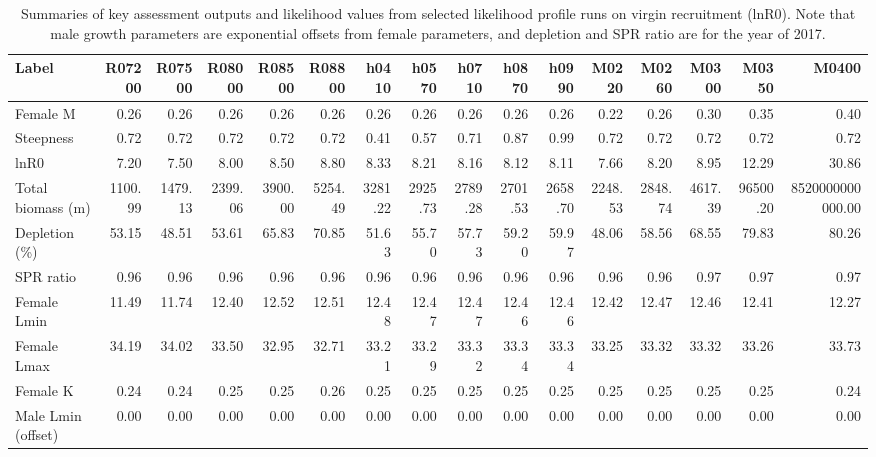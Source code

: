 \documentclass[12pt,]{article}
\begin{document}
\begin{landscape}
\begin{table}[ht]
\centering
\caption{Summaries of key assessment outputs 
                                              and likelihood values from selected 
                                              likelihood profile runs on virgin 
                                              recruitment (lnR0).  Note that male 
                                              growth parameters are exponential 
                                              offsets from female parameters, and 
                                              depletion and SPR ratio are for the year of 2017.} 
\label{tab:like_profiles}
\begin{tabular}{lrrrrrrrrrrrrrrr}
  \hline
Label & R07200 & R07500 & R08000 & R08500 & R08800 & h0410 & h0570 & h0710 & h0870 & h0990 & M0220 & M0260 & M0300 & M0350 & M0400 \\ 
  \hline
Female M & 0.26 & 0.26 & 0.26 & 0.26 & 0.26 & 0.26 & 0.26 & 0.26 & 0.26 & 0.26 & 0.22 & 0.26 & 0.30 & 0.35 & 0.40 \\ 
  Steepness & 0.72 & 0.72 & 0.72 & 0.72 & 0.72 & 0.41 & 0.57 & 0.71 & 0.87 & 0.99 & 0.72 & 0.72 & 0.72 & 0.72 & 0.72 \\ 
  lnR0 & 7.20 & 7.50 & 8.00 & 8.50 & 8.80 & 8.33 & 8.21 & 8.16 & 8.12 & 8.11 & 7.66 & 8.20 & 8.95 & 12.29 & 30.86 \\ 
  Total biomass (m) & 1100.99 & 1479.13 & 2399.06 & 3900.00 & 5254.49 & 3281.22 & 2925.73 & 2789.28 & 2701.53 & 2658.70 & 2248.53 & 2848.74 & 4617.39 & 96500.20 & 8520000000000.00 \\ 
  Depletion (\%) & 53.15 & 48.51 & 53.61 & 65.83 & 70.85 & 51.63 & 55.70 & 57.73 & 59.20 & 59.97 & 48.06 & 58.56 & 68.55 & 79.83 & 80.26 \\ 
  SPR ratio & 0.96 & 0.96 & 0.96 & 0.96 & 0.96 & 0.96 & 0.96 & 0.96 & 0.96 & 0.96 & 0.96 & 0.96 & 0.97 & 0.97 & 0.97 \\ 
  Female Lmin & 11.49 & 11.74 & 12.40 & 12.52 & 12.51 & 12.48 & 12.47 & 12.47 & 12.46 & 12.46 & 12.42 & 12.47 & 12.46 & 12.41 & 12.27 \\ 
  Female Lmax & 34.19 & 34.02 & 33.50 & 32.95 & 32.71 & 33.21 & 33.29 & 33.32 & 33.34 & 33.34 & 33.25 & 33.32 & 33.32 & 33.26 & 33.73 \\ 
  Female K & 0.24 & 0.24 & 0.25 & 0.25 & 0.26 & 0.25 & 0.25 & 0.25 & 0.25 & 0.25 & 0.25 & 0.25 & 0.25 & 0.25 & 0.24 \\ 
  Male Lmin (offset) & 0.00 & 0.00 & 0.00 & 0.00 & 0.00 & 0.00 & 0.00 & 0.00 & 0.00 & 0.00 & 0.00 & 0.00 & 0.00 & 0.00 & 0.00 \\ 

\end{tabular}
\end{table}
\end{landscape}
\end{document}
